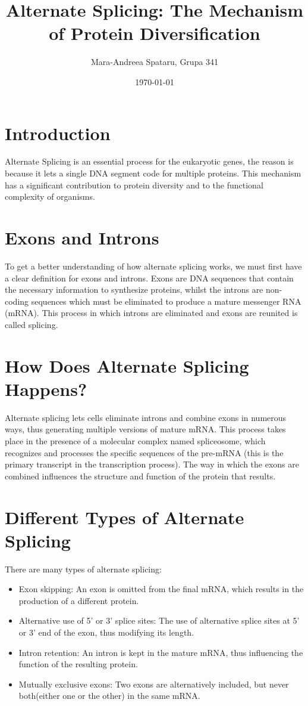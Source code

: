 \documentclass[12pt,a4paper]{article}
\title{Alternate Splicing: The Mechanism of Protein Diversification}
\author{Mara-Andreea Spataru, Grupa 341}
\date{\today}
\begin{document}
	
	\maketitle
	
	\begin{multicols}{2}
		\section{Introduction}
		Alternate Splicing is an essential process for the eukaryotic genes, the reason is because it lets a single DNA segment code for multiple proteins. This mechanism has a significant contribution to protein diversity and to the functional complexity of organisms.
		
		\section{Exons and Introns}
		To get a better understanding of how alternate splicing works, we must first have a clear definition for exons and introns. Exons are DNA sequences that contain the necessary information to synthesize proteins, whilst the introns are non-coding sequences which must be eliminated to produce a mature messenger RNA (mRNA). This process in which introns are eliminated and exons are reunited is called splicing.
		
		
		\section{How Does Alternate Splicing Happens?}
		Alternate splicing lets cells eliminate introns and combine exons in numerous ways, thus generating multiple versions of mature mRNA. This process takes place in the presence of a molecular complex named spliceosome, which recognizes and processes the specific sequences of the pre-mRNA (this is the primary transcript in the transcription process). The way in which the exons are combined influences the structure and function of the protein that results.
		
		\section{Different Types of Alternate Splicing}
		There are many types of alternate splicing:
		\begin{itemize}
			\item Exon skipping: An exon is omitted from the final mRNA, which results in the production of a different protein.
			\item Alternative use of 5' or 3' splice sites: The use of alternative splice sites at 5' or 3' end of the exon, thus modifying its length.
			\item Intron retention: An intron is kept in the mature mRNA, thus influencing the function of the resulting protein.
			\item Mutually exclusive exons: Two exons are alternatively included, but never both(either one or the other) in the same mRNA.
		\end{itemize}
		

\end{multicols}
\end{document}
